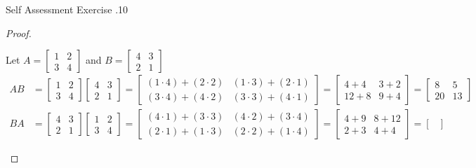 \documentclass[\main/notes.tex]{subfiles}
\begin{document}
\begin{exercise}{Self Assessment Exercise \thechapter.10}
\begin{enumerate}
							\begin{proof}
								$ $
								\begin{subproof} Let 
									$A = \begin{bmatrix}1 & 2\\ 3 & 4
								\end{bmatrix}$ and $B = \begin{bmatrix}4 & 3 \\ 2 & 1\end{bmatrix}$
									\begin{align*}
										AB &= \begin{bmatrix}
											1 & 2 \\ 3 & 4
										\end{bmatrix}\begin{bmatrix}
											4 & 3 \\ 2 & 1
										\end{bmatrix} = \begin{bmatrix}
											(1 \cdot 4) + (2 \cdot 2) & (1 \cdot 3) + (2 \cdot 1)\\
											(3 \cdot 4) + (4 \cdot 2) & (3 \cdot 3) + (4 \cdot 1)
										\end{bmatrix} = \begin{bmatrix}
											4 + 4 & 3 + 2\\
											12 + 8 & 9 + 4
										\end{bmatrix} = \begin{bmatrix}
											8 & 5\\
											20 & 13
										\end{bmatrix}\\
										BA &= \begin{bmatrix}
											4 & 3 \\ 2 & 1
										\end{bmatrix} \begin{bmatrix}
											1 & 2 \\ 3 & 4
										\end{bmatrix} = \begin{bmatrix}
											(4 \cdot 1) + (3 \cdot 3) & (4 \cdot 2) + (3 \cdot 4)\\
											(2 \cdot 1) + (1 \cdot 3) & (2 \cdot 2) + (1 \cdot 4)
										\end{bmatrix} = \begin{bmatrix}
											4 + 9 & 8 + 12\\
											2 + 3 & 4 + 4
										\end{bmatrix} = \begin{bmatrix}

\end{bmatrix}
\end{align*}
\end{subproof}
\end{proof}
\end{enumerate}
\end{exercise}
\end{document}
